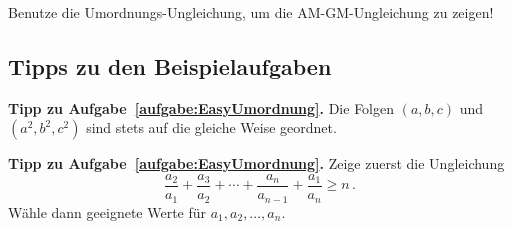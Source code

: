 \begin{aufgabe*}[*]\label{aufgabe:AM-GM-MitUmordnung}
	Benutze die Umordnungs-Ungleichung, um die AM-GM-Ungleichung zu zeigen!
\end{aufgabe*}

\subsection*{Tipps zu den Beispielaufgaben}
\textbf{Tipp zu Aufgabe~\ref{aufgabe:EasyUmordnung}.} Die Folgen $(a,b,c)$ und $(a^2,b^2,c^2)$ sind stets auf die gleiche Weise geordnet.

\textbf{Tipp zu Aufgabe~\ref{aufgabe:EasyUmordnung}.} Zeige zuerst die Ungleichung
\begin{equation*}
	\frac{a_2}{a_1}+\frac{a_3}{a_2}+\dotsb+\frac{a_n}{a_{n-1}}+\frac{a_1}{a_n}\geqslant n\,.
\end{equation*}
Wähle dann geeignete Werte für $a_1,a_2,\dotsc,a_n$.